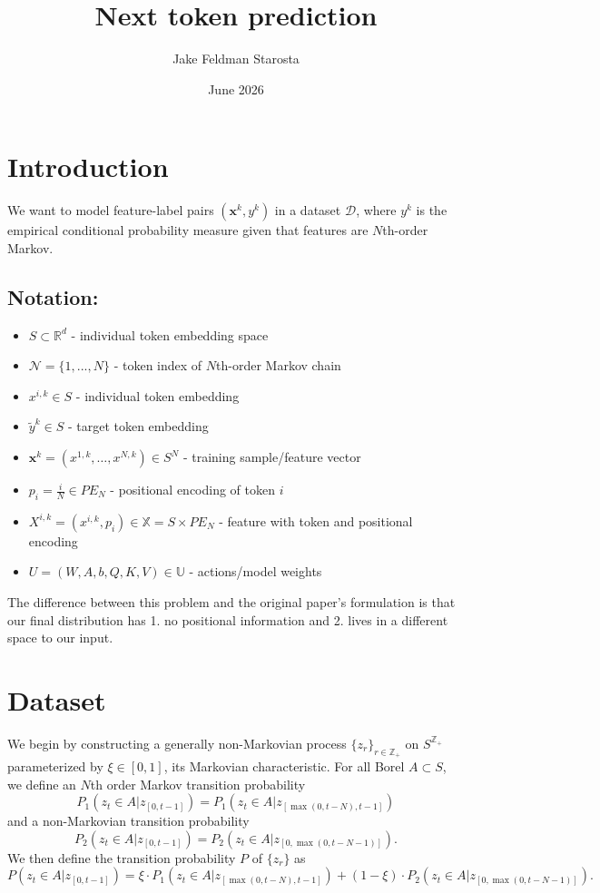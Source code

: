 \documentclass{article}
\title{Next token prediction}
\author{Jake Feldman Starosta}
\date{June 2026}
\begin{document}
\maketitle

\section{Introduction}
We want to model feature-label pairs $(\bm{x}^k, y^k)$ in a dataset $\mathcal{D}$, where $y^k$ is the empirical conditional probability measure given that features are $N$th-order Markov. 

\subsection{Notation:}
\begin{itemize}
\item $S \subset \mathbb{R}^d$ - individual token embedding space 
\item $\mathcal{N} = \{1, ..., N\} $ - token index of $N$th-order Markov chain
\item $x^{i,k} \in S$ - individual token embedding
\item $\tilde y^k \in S$ - target token embedding
\item $\bm{x}^k = (x^{1, k}, \dots, x^{N, k}) \in S^N$ - training sample/feature vector
\item $p_i = \frac{i}{N} \in PE_N$ - positional encoding of token $i$
\item $X^{i,k} = (x^{i, k} , p_i) \in \mathbb{X} = S\times PE_N$ - feature with token and  positional encoding
\item $U = (W, A, b, Q, K, V) \in \mathbb{U}$ - actions/model weights


\end{itemize}

The difference between this problem and the original paper's \cite{akman2026optimalcontrolapproachtransformer} formulation is that our final distribution has 1. no positional information and 2. lives in a different space to our input. 


\section{Dataset}
We begin by constructing a generally non-Markovian process $\{z_r\}_{r \in \mathbb{Z_+}}$ on $S^\mathbb{Z_+}$ parameterized by $\xi \in [0,1]$, its Markovian characteristic. For all Borel $A \subset S$, we define an $N$th order Markov transition probability
$$P_1(z_t\in A|z_{[0, t-1]}) = P_1(z_t\in A|z_{[\max(0, t-N), t-1]})$$
and a non-Markovian transition probability 
$$P_2(z_t\in A|z_{[0, t-1]}) = P_2(z_t\in A|z_{[0, \max(0, t-N-1)]}).
$$ 
We then define the transition probability $P$ of $\{z_r\}$ as 
$$ P(z_t\in A|z_{[0, t-1]}) = \xi \cdot P_1(z_t\in A|z_{[\max(0, t-N), t-1]}) + (1 - \xi) \cdot P_2(z_t\in A|z_{[0, \max(0, t-N-1)]}).
$$
\end{document}
